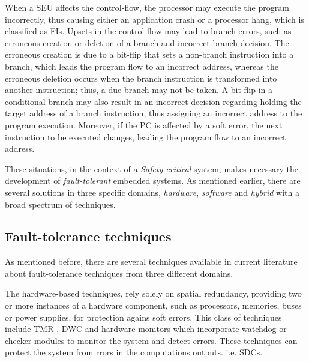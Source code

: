 \documentclass[10pt, a4paper]{report}
\begin{document}
When a \acrshort{SEU} affects the control-flow, the processor may execute the
program incorrectly, thus causing either an application crash or a processor
hang, which is classified as \acrshort{FI}s. Upsets in the control-flow may lead
to branch errors, such as erroneous creation or deletion of a branch and
incorrect branch decision. The erroneous creation is due to a bit-flip that sets
a non-branch instruction into a branch, which leads the program flow to an
incorrect address, whereas the erroneous deletion occurs when the branch
instruction is transformed into another instruction; thus, a due branch may not
be taken. A bit-flip in a conditional branch may also result in an incorrect
decision regarding holding the target address of a branch instruction, thus
assigning an incorrect address to the program execution. Moreover, if the
\acrfull{PC} is affected by a soft error, the next instruction to be executed
changes, leading the program flow to an incorrect address.

These situations, in the context of a \emph{Safety-critical} system, makes
necessary the development of \emph{fault-tolerant} embedded systems. As
mentioned earlier, there are several solutions in three specific domains,
\emph{hardware}, \emph{software} and \emph{hybrid} with a broad spectrum of
techniques.

\subsection{Fault-tolerance techniques}

As mentioned before, there are several techniques available in current
literature about fault-tolerance techniques from three different domains.

The hardware-based techniques, rely solely on spatial redundancy, providing two
or more instances of a hardware component, such as processors, memories, buses
or power supplies, for protection agains soft errors. This class of techniques
include \acrfull{TMR} \cite{tmr_paper}, \acrfull{DWC} and hardware monitors which 
incorporate watchdog or checker modules to monitor the system and detect errors. 
These techniques can protect the system from rrors in the computations outputs. 
i.e. \acrshort{SDC}s.
\end{document}
